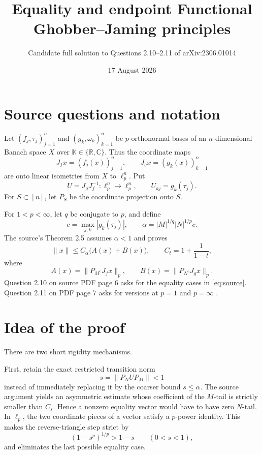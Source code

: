 \documentclass[11pt]{article}
\title{Equality and endpoint Functional Ghobber--Jaming principles}
\author{Candidate full solution to Questions 2.10--2.11 of arXiv:2306.01014}
\date{17 August 2026}
\newcommand{\K}{\mathbb K}
\begin{document}
\maketitle

\begin{center}
\end{center}

\section{Source questions and notation}

Let $(f_j,\tau_j)_{j=1}^n$ and $(g_k,\omega_k)_{k=1}^n$ be
$p$-orthonormal bases of an $n$-dimensional Banach space $X$ over
$\K\in\{\mathbb R,\mathbb C\}$.  Thus the coordinate maps
\[
 J_f x=(f_j(x))_{j=1}^n,\qquad J_gx=(g_k(x))_{k=1}^n
\]
are onto linear isometries from $X$ to $\ell_p^n$.  Put
\[
 U=J_gJ_f^{-1}:\ell_p^n\longrightarrow\ell_p^n,
 \qquad U_{kj}=g_k(\tau_j).
\]
For $S\subset[n]$, let $P_S$ be the coordinate projection onto $S$.

For $1<p<\infty$, let $q$ be conjugate to $p$, and define
\[
 c=\max_{j,k}|g_k(\tau_j)|,
 \qquad \alpha=|M|^{1/q}|N|^{1/p}c.
\]
The source's Theorem 2.5 assumes $\alpha<1$ and proves
\begin{equation}\label{eq:source}
 \|x\|\le C_\alpha\bigl(A(x)+B(x)\bigr),\qquad
 C_t=1+\frac1{1-t},
\end{equation}
where
\[
 A(x)=\|P_{M^c}J_fx\|_p,
 \qquad B(x)=\|P_{N^c}J_gx\|_p.
\]
Question 2.10 on source PDF page 6 asks for the equality cases in
\eqref{eq:source}.  Question 2.11 on PDF page 7 asks for versions at
$p=1$ and $p=\infty$ \cite{Krishna}.

\section{Idea of the proof}

There are two short rigidity mechanisms.

First, retain the exact restricted transition norm
\[
 s=\|P_NUP_M\|<1
\]
instead of immediately replacing it by the coarser bound $s\le\alpha$.
The source argument yields an asymmetric estimate whose coefficient of the
$M$-tail is strictly smaller than $C_s$.  Hence a nonzero equality vector
would have to have zero $N$-tail.  In $\ell_p$, the two coordinate pieces of a
vector satisfy a $p$-power identity.  This makes the reverse-triangle step
strict by
\[
 (1-s^p)^{1/p}>1-s\qquad(0<s<1),
\]
and eliminates the last possible equality case.
\end{document}
